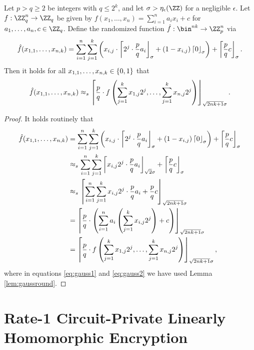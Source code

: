 \begin{lemma}
\label{lemma:CompfriendlySubgroupEmulation}
Let $p > q \geq 2$ be integers with $q \leq 2^k$, and let $\sigma > \eta_\epsilon(\ZZ)$ for a negligible $\epsilon$. Let $f: \ZZ_q^n \to \ZZ_q$ be given by $f(x_1,\dots,x_n) = \sum_{i = 1}^n a_i x_i + c$ for $a_1,\dots,a_n,c \in \ZZ_q$. Define the randomized function $\hat{f}: \bin^{nk} \to \ZZ_p^n$ via
\[
\hat{f}(x_{1,1},\dots,x_{n,k}) = \sum_{i = 1}^n \sum_{j = 1}^k \left(x_{i,j} \cdot \left\lceil 2^j \cdot \frac{p}{q} a_i \right\rfloor_{\sigma} + (1 - x_{i,j})\left\lceil 0 \right\rfloor_{\sigma}\right) + \left\lceil \frac{p}{q} c \right\rfloor_{\sigma}.
\]
Then it holds for all $x_{1,1},\dots,x_{n,k} \in \{0,1\}$ that
\[
\hat{f}(x_{1,1},\dots,x_{n,k}) \approx_s \left\lceil \frac{p}{q} \cdot f\left(\sum_{j=1}^k x_{1,j} 2^j,\dots,\sum_{j=1}^k x_{n,j}2^j\right) \right\rfloor_{\sqrt{2nk+1} \sigma}.
\]
\end{lemma}

\begin{proof}
It holds routinely that
\begin{align}
\hat{f}(x_{1,1},\dots,x_{n,k}) &= \sum_{i = 1}^n \sum_{j = 1}^k \left(x_{i,j} \cdot \left\lceil 2^j \cdot \frac{p}{q} a_i \right\rfloor_{\sigma} + (1 - x_{i,j})\left\lceil 0 \right\rfloor_{\sigma}\right) + \left\lceil \frac{p}{q} c \right\rfloor_{\sigma} \nonumber \\
&\approx_s \sum_{i = 1}^n \sum_{j = 1}^k \left\lceil x_{i,j} 2^j \cdot \frac{p}{q} a_i \right\rfloor_{\sqrt{2}\sigma} + \left\lceil \frac{p}{q} c \right\rfloor_{\sigma} \label{eq:gauss1}\\
&\approx_s \left\lceil \sum_{i = 1}^n \sum_{j = 1}^k x_{i,j} 2^j \cdot \frac{p}{q} a_i + \frac{p}{q} c \right\rfloor_{\sqrt{2nk+1}\sigma} \label{eq:gauss2}\\
&= \left\lceil \frac{p}{q} \cdot \left(\sum_{i = 1}^n a_i \left( \sum_{j = 1}^k x_{i,j} 2^j \right) + c \right) \right\rfloor_{\sqrt{2nk+1}\sigma} \nonumber\\
&= \left\lceil \frac{p}{q} \cdot f\left(\sum_{j=1}^k x_{1,j} 2^j,\dots,\sum_{j=1}^k x_{n,j}2^j\right) \right\rfloor_{\sqrt{2nk+1}\sigma} \nonumber,
\end{align}
where in equations \eqref{eq:gauss1} and \eqref{eq:gauss2} we have used Lemma \ref{lem:gaussround}.
\end{proof}

\section{Rate-1 Circuit-Private Linearly Homomorphic Encryption}
\label{sec:ShrinkLHE}


